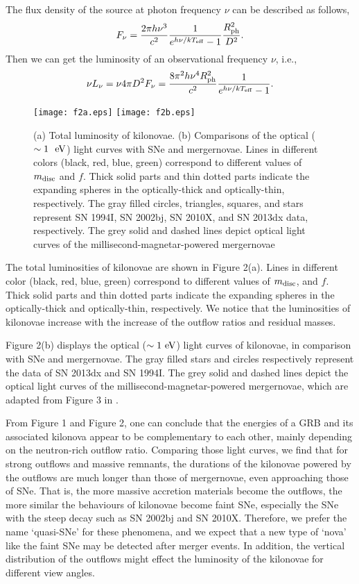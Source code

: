 \documentclass[a4paper,fleqn,usenatbib]{mnras}
\def\beq{\begin{eqnarray}}
\def\eeq{\end{eqnarray}}
\begin{document}
The flux density of the source at photon frequency $\nu$ can be described as follows,
\beq
F_{\nu}=\frac{2\pi h{\nu}^3}{c^2}\frac{1}{e^{h\nu/kT_{\rm eff}}-1}\frac{R_{\rm ph}^2}{D^2}.
\eeq
Then we can get the luminosity of an observational frequency $\nu$, i.e.,
\beq
\nu L_{\nu}=\nu 4\pi D^2 F_{\rm \nu}=\frac{8{\pi}^2 h{\nu}^4 R_{\rm ph}^2 }{c^2}\frac{1}{e^{h\nu/kT_{\rm eff}}-1}.
\eeq

\begin{figure}
\centering
\texttt{[image: f2a.eps]}
\texttt{[image: f2b.eps]}
\caption{(a) Total luminosity of kilonovae. (b) Comparisons of the optical ($\sim 1~\rm~eV$) light curves with SNe and mergernovae. Lines in different colors (black, red, blue, green) correspond to different values of $m_{\rm disc}$ and $f$. Thick solid parts and thin dotted parts indicate the expanding spheres in the optically-thick and optically-thin, respectively. The gray filled circles, triangles, squares, and stars represent SN 1994I, SN 2002bj, SN 2010X, and SN 2013dx data, respectively. The grey solid and dashed lines depict optical light curves of the millisecond-magnetar-powered mergernovae\citet[]{Yu2013}}
\end{figure}

The total luminosities of kilonovae are shown in Figure 2(a). Lines in different color (black, red, blue, green) correspond to different values of $m_{\rm disc}$, and $f$. Thick solid parts and thin dotted parts indicate the expanding spheres in the optically-thick and optically-thin, respectively. We notice that the luminosities of kilonovae increase with the increase of the outflow ratios and residual masses.

Figure 2(b) displays the optical ($\sim 1~\rm eV$) light curves of kilonovae, in comparison with SNe and mergernovae. The gray filled stars and circles respectively represent the data of SN 2013dx and SN 1994I. The grey solid and dashed lines depict the optical light curves of the millisecond-magnetar-powered mergernovae, which are adapted from Figure 3 in \citet[]{Yu2013}.

From Figure 1 and Figure 2, one can conclude that the energies of a GRB and its associated kilonova appear to be complementary to each other, mainly depending on the neutron-rich outflow ratio. Comparing those light curves, we find that for strong outflows and massive remnants, the durations of the kilonovae powered by the outflows are much longer than those of mergernovae, even approaching those of SNe. That is, the more massive accretion materials become the outflows, the more similar the behaviours of kilonovae become faint SNe, especially the SNe with the steep decay such as SN 2002bj and SN 2010X. Therefore, we prefer the name `quasi-SNe' for these phenomena, and we expect that a new type of `nova' like the faint SNe may be detected after merger events. In addition, the vertical distribution of the outflows might effect the luminosity of the kilonovae for different view angles.
\end{document}
